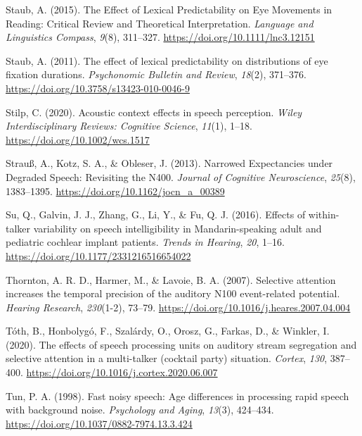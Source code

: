\documentclass[a4paper, nobind]{templates/ociamthesis}
\newlength{\cslhangindent}
\newenvironment{CSLReferences}[2] %
 {%
  \setlength{\parindent}{0pt}
  \ifodd #1
  \let\oldpar\par
  \def\par{\hangindent=\cslhangindent\oldpar}
  \fi
  \setlength{\parskip}{1mm}
  \setlength{\baselineskip}{6mm}
 }%
 {}
\begin{document}
\begin{CSLReferences}{1}{0}
\leavevmode{}%
Staub, A. (2015). The Effect of Lexical Predictability on Eye Movements in Reading: Critical Review and Theoretical Interpretation. \emph{Language and Linguistics Compass}, \emph{9}(8), 311--327. \url{https://doi.org/10.1111/lnc3.12151}

\leavevmode{}%
Staub, A. (2011). {The effect of lexical predictability on distributions of eye fixation durations}. \emph{Psychonomic Bulletin and Review}, \emph{18}(2), 371--376. \url{https://doi.org/10.3758/s13423-010-0046-9}

\leavevmode{}%
Stilp, C. (2020). {Acoustic context effects in speech perception}. \emph{Wiley Interdisciplinary Reviews: Cognitive Science}, \emph{11}(1), 1--18. \url{https://doi.org/10.1002/wcs.1517}

\leavevmode{}%
Strauß, A., Kotz, S. A., \& Obleser, J. (2013). Narrowed Expectancies under Degraded Speech: Revisiting the N400. \emph{Journal of Cognitive Neuroscience}, \emph{25}(8), 1383--1395. \url{https://doi.org/10.1162/jocn_a_00389}

\leavevmode{}%
Su, Q., Galvin, J. J., Zhang, G., Li, Y., \& Fu, Q. J. (2016). {Effects of within-talker variability on speech intelligibility in Mandarin-speaking adult and pediatric cochlear implant patients}. \emph{Trends in Hearing}, \emph{20}, 1--16. \url{https://doi.org/10.1177/2331216516654022}

\leavevmode{}%
Thornton, A. R. D., Harmer, M., \& Lavoie, B. A. (2007). {Selective attention increases the temporal precision of the auditory N100 event-related potential}. \emph{Hearing Research}, \emph{230}(1-2), 73--79. \url{https://doi.org/10.1016/j.heares.2007.04.004}

\leavevmode{}%
Tóth, B., Honbolygó, F., Szalárdy, O., Orosz, G., Farkas, D., \& Winkler, I. (2020). {The effects of speech processing units on auditory stream segregation and selective attention in a multi-talker (cocktail party) situation}. \emph{Cortex}, \emph{130}, 387--400. \url{https://doi.org/10.1016/j.cortex.2020.06.007}

\leavevmode{}%
Tun, P. A. (1998). {Fast noisy speech: Age differences in processing rapid speech with background noise}. \emph{Psychology and Aging}, \emph{13}(3), 424--434. \url{https://doi.org/10.1037/0882-7974.13.3.424}


\end{CSLReferences}
\end{document}
